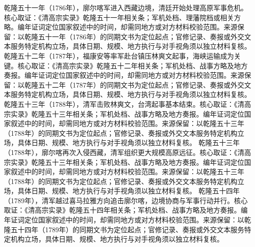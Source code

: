 乾隆五十一年（1786年），廓尔喀军进入西藏边境，清廷开始处理高原军事危机。核心取证：《清高宗实录》乾隆五十一年相关条；军机处档、理藩院档或相关方略。编年证词定位国家叙述中的时间，却需同地方或对方材料校验范围。来源保留：以乾隆五十一年（1786年）的同期文书为定位起点；官修记录、奏报或外交文本服务特定机构立场，具体日期、规模、地方执行与对手视角须以独立材料复核。
乾隆五十二年（1787年），福康安等率军赴台镇压林爽文起事，海峡运输成为关键。核心取证：《清高宗实录》乾隆五十二年相关条；军机处档、战事方略及地方奏报。编年证词定位国家叙述中的时间，却需同地方或对方材料校验范围。来源保留：以乾隆五十二年（1787年）的同期文书为定位起点；官修记录、奏报或外交文本服务特定机构立场，具体日期、规模、地方执行与对手视角须以独立材料复核。
乾隆五十三年（1788年），清军击败林爽文，台湾起事基本结束。核心取证：《清高宗实录》乾隆五十三年相关条；军机处档、战事方略及地方奏报。编年证词定位国家叙述中的时间，却需同地方或对方材料校验范围。来源保留：以乾隆五十三年（1788年）的同期文书为定位起点；官修记录、奏报或外交文本服务特定机构立场，具体日期、规模、地方执行与对手视角须以独立材料复核。
乾隆五十三年（1788年），廓尔喀再次入侵西藏，清军组织更大规模高原远征。核心取证：《清高宗实录》乾隆五十三年相关条；军机处档、战事方略及地方奏报。编年证词定位国家叙述中的时间，却需同地方或对方材料校验范围。来源保留：以乾隆五十三年（1788年）的同期文书为定位起点；官修记录、奏报或外交文本服务特定机构立场，具体日期、规模、地方执行与对手视角须以独立材料复核。
乾隆五十四年（1789年），清军越过喜马拉雅方向追击廓尔喀，边境协商与军事行动并行。核心取证：《清高宗实录》乾隆五十四年相关条；军机处档、战事方略及地方奏报。编年证词定位国家叙述中的时间，却需同地方或对方材料校验范围。来源保留：以乾隆五十四年（1789年）的同期文书为定位起点；官修记录、奏报或外交文本服务特定机构立场，具体日期、规模、地方执行与对手视角须以独立材料复核。
